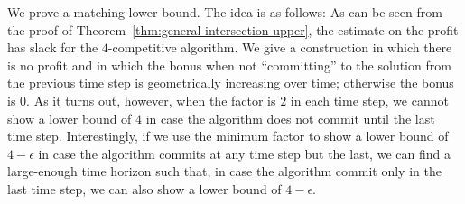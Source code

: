 \documentclass[a4paper]{book}
\begin{document}
We prove a matching lower bound. The idea is as follows: As can be seen from the proof of Theorem~\ref{thm:general-intersection-upper}, the estimate on the profit has slack for the $4$-competitive algorithm. We give a construction in which there is no profit and in which the bonus when not ``committing'' to the solution from the previous time step is geometrically increasing over time; otherwise the bonus is $0$. As it turns out, however, when the factor is $2$ in each time step, we cannot show a lower bound of $4$ in case the algorithm does not commit until the last time step. Interestingly, if we use the minimum factor to show a lower bound of $4-\epsilon$ in case the algorithm commits at any time step but the last, we can find a large-enough time horizon such that, in case the algorithm commit only in the last time step, we can also show a lower bound of $4-\epsilon$.
\end{document}

